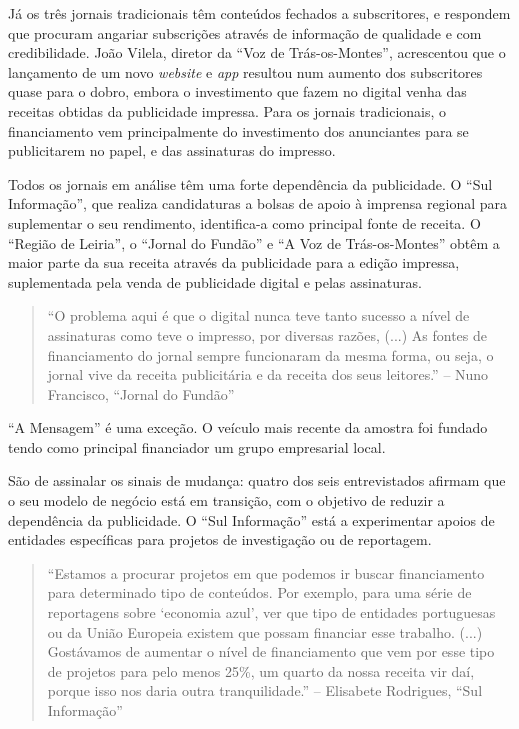 \documentclass[portuguese]{textolivre}
\begin{document}
Já os três jornais tradicionais têm conteúdos fechados a subscritores, e
respondem que procuram angariar subscrições através de informação de
qualidade e com credibilidade. João Vilela, diretor da ``Voz de
Trás-os-Montes'', acrescentou que o lançamento de um novo \emph{website}
e \emph{app} resultou num aumento dos subscritores quase para o dobro,
embora o investimento que fazem no digital venha das receitas obtidas da
publicidade impressa. Para os jornais tradicionais, o financiamento vem
principalmente do investimento dos anunciantes para se publicitarem no
papel, e das assinaturas do impresso.

Todos os jornais em análise têm uma forte dependência da publicidade. O
``Sul Informação'', que realiza candidaturas a bolsas de apoio à
imprensa regional para suplementar o seu rendimento, identifica-a como
principal fonte de receita. O ``Região de Leiria'', o ``Jornal do
Fundão'' e ``A Voz de Trás-os-Montes'' obtêm a maior parte da sua
receita através da publicidade para a edição impressa, suplementada pela
venda de publicidade digital e pelas assinaturas.

\begin{quote}
``O problema aqui é que o digital nunca teve tanto sucesso a nível de
assinaturas como teve o impresso, por diversas razões, (...) As fontes
de financiamento do jornal sempre funcionaram da mesma forma, ou seja, o
jornal vive da receita publicitária e da receita dos seus leitores.'' --
Nuno Francisco, ``Jornal do Fundão''
\end{quote}

``A Mensagem'' é uma exceção. O veículo mais recente da amostra foi
fundado tendo como principal financiador um grupo empresarial local.

São de assinalar os sinais de mudança: quatro dos seis entrevistados
afirmam que o seu modelo de negócio está em transição, com o objetivo de
reduzir a dependência da publicidade. O ``Sul Informação'' está a
experimentar apoios de entidades específicas para projetos de
investigação ou de reportagem.

\begin{quote}
``Estamos a procurar projetos em que podemos ir buscar financiamento
para determinado tipo de conteúdos. Por exemplo, para uma série de
reportagens sobre `economia azul', ver que tipo de entidades portuguesas
ou da União Europeia existem que possam financiar esse trabalho. (...)
Gostávamos de aumentar o nível de financiamento que vem por esse tipo de
projetos para pelo menos 25\%, um quarto da nossa receita vir daí,
porque isso nos daria outra tranquilidade.'' -- Elisabete Rodrigues,
``Sul Informação''
\end{quote}
\end{document}
